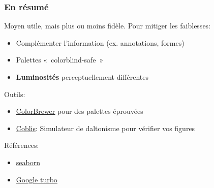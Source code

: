 \documentclass[aspectratio=169]{beamer}
\begin{document}
    


    



\begin{frame}[c]\frametitle{En résumé}

Moyen utile, mais plus ou moins fidèle.
Pour mitiger les faiblesses:\vspace{-\parskip}
\begin{itemize}
	\item Complémenter l'information (ex. annotations, formes)
	\item Palettes «~colorblind-safe~»
	\item \textbf{Luminosités} perceptuellement différentes
\end{itemize}

Outils:\vspace{-\parskip}
\begin{itemize}
	\item \href{https://colorbrewer2.org/}{\underline{ColorBrewer}} pour des palettes éprouvées
	\item \href{https://www.color-blindness.com/coblis-color-blindness-simulator/}{\underline{Coblis}}: Simulateur de daltonisme pour vérifier vos figures 
\end{itemize}

Références:\vspace{-\parskip}
\begin{itemize}
	\item \href{https://seaborn.pydata.org/tutorial/color_palettes.html}{\underline{seaborn}}
	\item \href{https://ai.googleblog.com/2019/08/turbo-improved-rainbow-colormap-for.html}{\underline{Google turbo}}
\end{itemize}

\end{frame}
\end{document}
